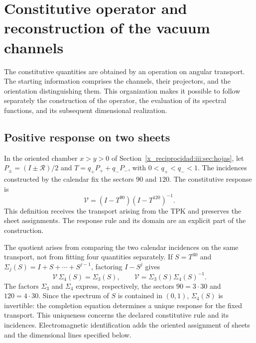 

\chapter{Constitutive operator and reconstruction of the vacuum channels}
\label{x_reciprocidad:iii:sec:constitutiva}

The constitutive quantities are obtained by an operation on angular
transport. The starting information comprises the channels, their
projectors, and the orientation distinguishing them. This organization makes it possible
to follow separately the construction of the operator, the evaluation of its
spectral functions, and its subsequent dimensional realization.

\section{Positive response on two sheets}

In the oriented chamber $x>y>0$ of Section~\ref{x_reciprocidad:iii:sec:hojas}, let
$P_\pm=(I\pm\mathcal R)/2$ and
$T=q_+P_++q_-P_-$, with $0<q_+<q_-<1$. The incidences constructed by the
calendar fix the sectors $90$ and $120$. The constitutive response is
\begin{equation}
 \mathcal V=(I-T^{90})(I-T^{120})^{-1}.
 \label{x_reciprocidad:iii:eq:vacuum-op}
\end{equation}
This definition receives the transport arising from the TPK and preserves the
sheet assignments. The response rule and its domain are an explicit part
of the construction.

The quotient arises from comparing the two calendar incidences on
the same transport, not from fitting four quantities separately. If
$S=T^{30}$ and $\Sigma_j(S)=I+S+\cdots+S^{j-1}$, factoring
$I-S^j$ gives
\begin{equation}
 \mathcal V\,\Sigma_4(S)=\Sigma_3(S),\qquad
 \mathcal V=\Sigma_3(S)\Sigma_4(S)^{-1}.
 \label{x_reciprocidad:iii:eq:completion-response}
\end{equation}
The factors $\Sigma_3$ and $\Sigma_4$ express, respectively, the
sectors $90=3\cdot30$ and $120=4\cdot30$. Since the spectrum of $S$ is
contained in $(0,1)$, $\Sigma_4(S)$ is invertible: the completion
equation determines a unique response for the fixed transport.
This uniqueness concerns the declared constitutive rule and its
incidences. Electromagnetic identification adds the oriented
assignment of sheets and the dimensional lines specified
below.

